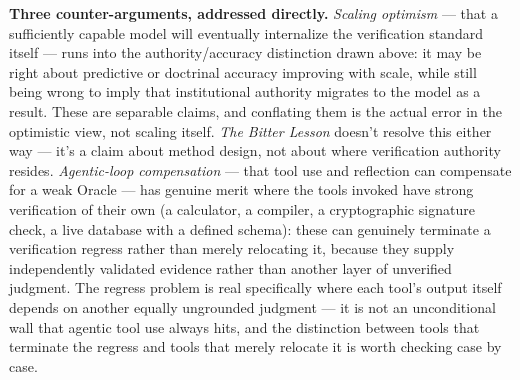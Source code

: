 \textbf{Three counter-arguments, addressed directly.} \emph{Scaling optimism} --- that a sufficiently capable model will eventually internalize the verification standard itself --- runs into the authority/accuracy distinction drawn above: it may be right about predictive or doctrinal accuracy improving with scale, while still being wrong to imply that institutional authority migrates to the model as a result. These are separable claims, and conflating them is the actual error in the optimistic view, not scaling itself. \emph{The Bitter Lesson} doesn't resolve this either way --- it's a claim about method design, not about where verification authority resides. \emph{Agentic-loop compensation} --- that tool use and reflection can compensate for a weak Oracle --- has genuine merit where the tools invoked have strong verification of their own (a calculator, a compiler, a cryptographic signature check, a live database with a defined schema): these can genuinely terminate a verification regress rather than merely relocating it, because they supply independently validated evidence rather than another layer of unverified judgment. The regress problem is real specifically where each tool's output itself depends on another equally ungrounded judgment --- it is not an unconditional wall that agentic tool use always hits, and the distinction between tools that terminate the regress and tools that merely relocate it is worth checking case by case.
